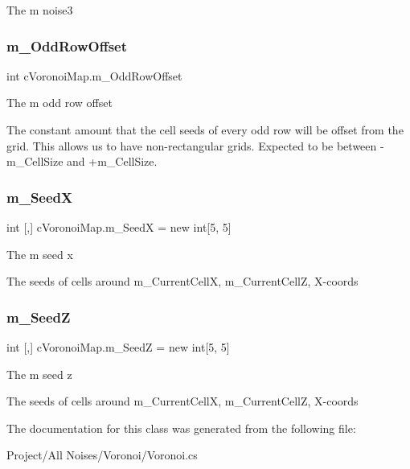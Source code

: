 The m noise3 

\mbox{\label{classc_voronoi_map_ad9ad1936c8ef202c65c51d4524684094}} 
\subsubsection{\texorpdfstring{m\+\_\+\+Odd\+Row\+Offset}{m\_OddRowOffset}}
{\footnotesize\ttfamily int c\+Voronoi\+Map.\+m\+\_\+\+Odd\+Row\+Offset\hspace{0.3cm}{\ttfamily [protected]}}



The m odd row offset 

The constant amount that the cell seeds of every odd row will be offset from the grid. This allows us to have non-\/rectangular grids. Expected to be between -\/m\+\_\+\+Cell\+Size and +m\+\_\+\+Cell\+Size. \mbox{\label{classc_voronoi_map_a66f740639832ef2ac10e9031387cbd27}} 
\subsubsection{\texorpdfstring{m\+\_\+\+SeedX}{m\_SeedX}}
{\footnotesize\ttfamily int \mbox{[},\mbox{]} c\+Voronoi\+Map.\+m\+\_\+\+SeedX = new int\mbox{[}5, 5\mbox{]}\hspace{0.3cm}{\ttfamily [protected]}}



The m seed x 

The seeds of cells around m\+\_\+\+Current\+CellX, m\+\_\+\+Current\+CellZ, X-\/coords \mbox{\label{classc_voronoi_map_afbaf9b18957ec7e155dae273f9178cf9}} 
\subsubsection{\texorpdfstring{m\+\_\+\+SeedZ}{m\_SeedZ}}
{\footnotesize\ttfamily int \mbox{[},\mbox{]} c\+Voronoi\+Map.\+m\+\_\+\+SeedZ = new int\mbox{[}5, 5\mbox{]}\hspace{0.3cm}{\ttfamily [protected]}}



The m seed z 

The seeds of cells around m\+\_\+\+Current\+CellX, m\+\_\+\+Current\+CellZ, X-\/coords 

The documentation for this class was generated from the following file\+:\begin{DoxyCompactItemize}
\item 
Project/\+All Noises/\+Voronoi/Voronoi.\+cs\end{DoxyCompactItemize}
